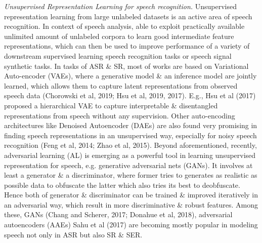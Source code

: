 \documentclass{article}
\begin{document}
\begin{itemize}
\begin{itemize}
\begin{itemize}
            {\it Unsupervised Representation Learning for speech recognition.} Unsupervised representation learning from large unlabeled datasets is an active area of speech recognition. In context of speech analysis, able to exploit practically available unlimited amount of unlabeled corpora to learn good intermediate feature representations, which can then be used to improve performance of a variety of downstream supervised learning speech recognition tasks or speech signal synthetic tasks. In tasks of ASR \& SR, most of works are based on Variational Auto-encoder (VAEs), where a generative model \& an inference model are jointly learned, which allows them to capture latent representations from observed speech data (Chorowski et al, 2019; Hsu et al, 2019, 2017). E.g., Hsu et al (2017) proposed a hierarchical VAE to capture interpretable \& disentangled representations from speech without any supervision. Other auto-encoding architectures like Denoised Autoencoder (DAEs) are also found very promising in finding speech representations in an unsupervised way, especially for noisy speech recognition (Feng et al, 2014; Zhao et al, 2015). Beyond aforementioned, recently, adversarial learning (AL) is emerging as a powerful tool in learning unsupervised representation for speech, e.g. generative adversarial nets (GANs). It involves at least a generator \& a discriminator, where former tries to generates as realistic as possible data to obfuscate the latter which also tries its best to deobfuscate. Hence both of generator \& discriminator can be trained \& improved iteratively in an adversarial way, which result in more discriminative \& robust features. Among these, GANs (Chang and Scherer, 2017; Donahue et al, 2018), adversarial autoencoders (AAEs) Sahu et al (2017) are becoming mostly popular in modeling speech not only in ASR but also SR \& SER.


\end{itemize}
\end{itemize}
\end{itemize}
\end{document}
